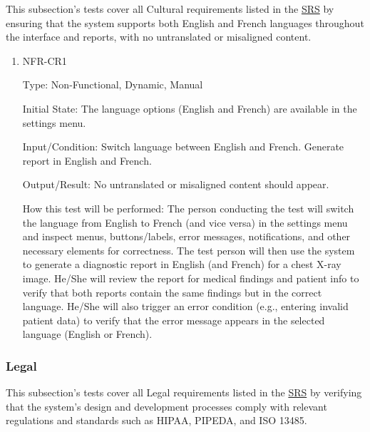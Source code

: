 \documentclass[12pt, titlepage]{article}
\begin{document}
This subsection's tests cover all Cultural requirements listed in the \href{https://github.com/RezaJodeiri/CXR-Capstone/blob/main/docs/SRS/SRS.pdf}{SRS} \citep{SRS}
 by ensuring that the system supports both English and French languages throughout the interface and reports, with no untranslated or misaligned content.

\begin{enumerate}

\item{NFR-CR1\\}\label{NFR-CR1}

Type: Non-Functional, Dynamic, Manual

Initial State: The language options (English and French) are available in the settings menu.

Input/Condition: Switch language between English and French. Generate report in English and French.

Output/Result: No untranslated or misaligned content should appear.

How this test will be performed: The person conducting the test will switch the language from English to French (and vice versa) in the settings menu and inspect menus, buttons/labels, error messages, notifications, and other necessary elements for correctness. The test person will then use the system to generate a diagnostic report in English (and French) for a chest X-ray image. He/She will review the report for medical findings and patient info to verify that both reports contain the same findings but in the correct language. He/She will also trigger an error condition (e.g., entering invalid patient data) to verify that the error message appears in the selected language (English or French).

\end{enumerate}

\subsubsection{Legal}

This subsection's tests cover all Legal requirements listed in the \href{https://github.com/RezaJodeiri/CXR-Capstone/blob/main/docs/SRS/SRS.pdf}{SRS} \citep{SRS}
 by verifying that the system's design and development processes comply with relevant regulations and standards such as HIPAA, PIPEDA, and ISO 13485.
\end{document}
